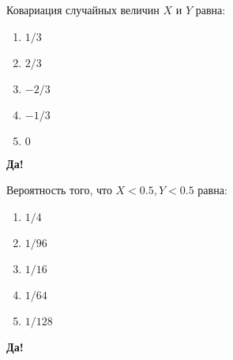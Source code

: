 \documentclass[t]{beamer}
\begin{document}
 \begin{frame} \label{32-Yes} 
\begin{block}{32} 

 Ковариация случайных величин $X$ и $Y$ равна:
  


 \end{block} 
\begin{enumerate} 
\item[] \hyperlink{32-No}{\beamergotobutton{} $1/3$}
\item[] \hyperlink{32-No}{\beamergotobutton{} $2/3$}
\item[] \hyperlink{32-No}{\beamergotobutton{} $-2/3$}
\item[] \hyperlink{32-Yes}{\beamergotobutton{} $-1/3$}
\item[] \hyperlink{32-No}{\beamergotobutton{} $0$}
\end{enumerate} 

 \textbf{Да!} 
 \hyperlink{33}{}\end{frame} 


 \begin{frame} \label{33-Yes} 
\begin{block}{33} 

 Вероятность того, что $X<0.5, Y<0.5$ равна:
  


 \end{block} 
\begin{enumerate} 
\item[] \hyperlink{33-No}{\beamergotobutton{} $1/4$}
\item[] \hyperlink{33-No}{\beamergotobutton{} $1/96$}
\item[] \hyperlink{33-No}{\beamergotobutton{} $1/16$}
\item[] \hyperlink{33-Yes}{\beamergotobutton{} $1/64$}
\item[] \hyperlink{33-No}{\beamergotobutton{} $1/128$}
\end{enumerate} 

 \textbf{Да!} 
 \hyperlink{34}{}\end{frame} 
\end{document}
